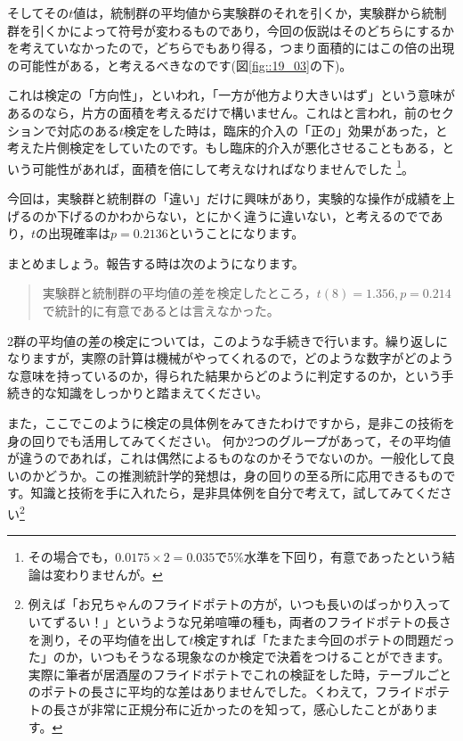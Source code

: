 \documentclass{ltjsbook}
\begin{document}
そしてその$t$値は，統制群の平均値から実験群のそれを引くか，実験群から統制群を引くかによって符号が変わるものであり，今回の仮説はそのどちらにするかを考えていなかったので，どちらでもあり得る，つまり面積的にはこの倍の出現の可能性がある，と考えるべきなのです(図\ref{fig::19_03}の下)。

これは検定の「方向性」，といわれ，「一方が他方より大きいはず」という意味があるのなら，片方の面積を考えるだけで構いません。これはと言われ，前のセクションで対応のある$t$検定をした時は，臨床的介入の「正の」効果があった，と考えた片側検定をしていたのです。もし臨床的介入が悪化させることもある，という可能性があれば，面積を倍にして考えなければなりませんでした
\footnote{その場合でも，$0.0175\times2=0.035$で5\%水準を下回り，有意であったという結論は変わりませんが。}。

今回は，実験群と統制群の「違い」だけに興味があり，実験的な操作が成績を上げるのか下げるのかわからない，とにかく違うに違いない，と考えるのでであり，$t$の出現確率は$p=0.2136$ということになります。


まとめましょう。報告する時は次のようになります。
\begin{quote}
    実験群と統制群の平均値の差を検定したところ，$t(8)=1.356,p=0.214$で統計的に有意であるとは言えなかった。
\end{quote}

2群の平均値の差の検定については，このような手続きで行います。繰り返しになりますが，実際の計算は機械がやってくれるので，どのような数字がどのような意味を持っているのか，得られた結果からどのように判定するのか，という手続き的な知識をしっかりと踏まえてください。

また，ここでこのように検定の具体例をみてきたわけですから，是非この技術を身の回りでも活用してみてください。
何か2つのグループがあって，その平均値が違うのであれば，これは偶然によるものなのかそうでないのか。一般化して良いのかどうか。この推測統計学的発想は，身の回りの至る所に応用できるものです。知識と技術を手に入れたら，是非具体例を自分で考えて，試してみてください\footnote{例えば「お兄ちゃんのフライドポテトの方が，いつも長いのばっかり入っていてずるい！」というような兄弟喧嘩の種も，両者のフライドポテトの長さを測り，その平均値を出して$t$検定すれば「たまたま今回のポテトの問題だった」のか，いつもそうなる現象なのか検定で決着をつけることができます。実際に筆者が居酒屋のフライドポテトでこれの検証をした時，テーブルごとのポテトの長さに平均的な差はありませんでした。くわえて，フライドポテトの長さが非常に正規分布に近かったのを知って，感心したことがあります。}
\end{document}

